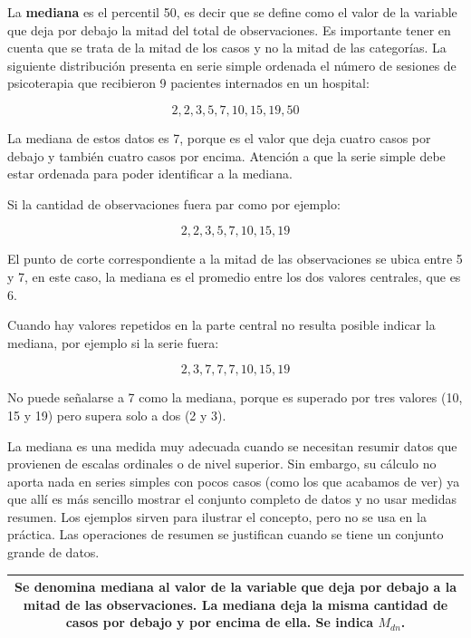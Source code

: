 \documentclass[]{book}
\begin{document}
La \textbf{mediana} es el percentil 50, es decir que se define como el valor de la variable que deja por debajo la mitad del total de observaciones. Es importante tener en cuenta que se trata de la mitad de los casos y no la mitad de las categorías. La siguiente distribución presenta en serie simple ordenada el número de sesiones de psicoterapia que recibieron 9 pacientes internados en un hospital:

\[2, 2, 3, 5, 7, 10, 15, 19, 50\]

La mediana de estos datos es 7, porque es el valor que deja cuatro casos por debajo y también cuatro casos por encima. Atención a que la serie simple debe estar ordenada para poder identificar a la mediana.

Si la cantidad de observaciones fuera par como por ejemplo:

\[2, 2, 3, 5, 7, 10, 15, 19\]

El punto de corte correspondiente a la mitad de las observaciones se
ubica entre 5 y 7, en este caso, la mediana es el promedio entre los dos valores centrales, que es 6.

Cuando hay valores repetidos en la parte central no resulta posible
indicar la mediana, por ejemplo si la serie fuera:

\[2, 3, 7, 7, 7, 10, 15, 19\]

No puede señalarse a 7 como la mediana, porque es superado por tres
valores (10, 15 y 19) pero supera solo a dos (2 y 3).

La mediana es una medida muy adecuada cuando se necesitan resumir datos que provienen de escalas ordinales o de nivel superior. Sin embargo, su cálculo no aporta nada en series simples con pocos casos (como los que acabamos de ver) ya que allí es más sencillo mostrar el conjunto completo de datos y no usar medidas resumen. Los ejemplos sirven para ilustrar el concepto, pero no se usa en la práctica. Las operaciones de resumen se justifican cuando se tiene un conjunto grande de datos.

\begin{longtable}[]{@{}c@{}}
\toprule
\endhead
\begin{minipage}[t]{0.97\columnwidth}\centering
Se denomina \textbf{mediana} al valor de la variable que deja por debajo a la mitad de las observaciones. La mediana deja la misma cantidad de casos por debajo y por encima de ella. Se indica \(M_{dn}\).\strut
\end{minipage}\tabularnewline
\bottomrule
\end{longtable}
\end{document}
